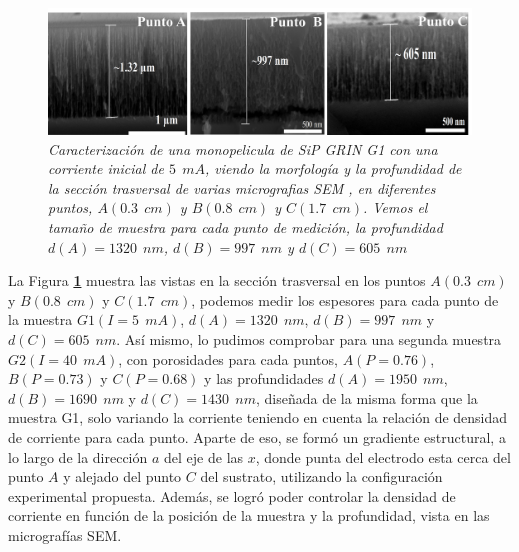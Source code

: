 \documentclass[a4paper,11pt,]{book}
\begin{document}
\begin{figure}[H]
	\centering
	\includegraphics[scale=.3]{../Images/semD11}
	\caption{\emph{Caracterización de una monopelicula de SiP GRIN G1 con una corriente inicial  de  $5 \ \ mA$, viendo  la morfología y la profundidad de la sección trasversal de varias micrografias SEM , en diferentes puntos, $A(0.3\ \ cm)$ y $ B(0.8 \ \  cm)$ y $ C(1.7 \ \  cm)$. Vemos el tamaño de muestra para cada punto de medición, la profundidad  $d(A)=1320 \ \ nm$, $d(B)=997\ \  nm$ y $d(C)=605\ \  nm$ } }
	\label{fig:DR4}
\end{figure} 
La Figura \textbf{\ref{fig:DR4}} muestra las vistas en la sección trasversal en los puntos $A(0.3\ \ cm)$ y $ B(0.8 \ \  cm)$ y $ C(1.7 \ \  cm)$, podemos medir  los espesores para cada punto de la muestra $G1(I=5 \ \ mA)$, $d(A)=1320 \ \ nm$, $d(B)=997\ \  nm$ y $d(C)=605\ \  nm$. Así mismo, lo pudimos comprobar para una segunda  muestra $G2 (I=40 \ \ mA)$, con porosidades para cada puntos, $A(P=0.76)$, $B(P=0.73)$ y $C(P= 0.68)$ y las profundidades  $d(A)=1950 \ \ nm$, $d(B)=1690\ \  nm$ y $d(C)=1430\ \  nm$, diseñada de la misma forma que la muestra G1, solo variando la corriente teniendo en cuenta la relación de densidad de corriente para cada punto. Aparte de eso, se formó un gradiente estructural, a lo largo de la dirección $a$ del eje de las $x$, donde  punta del electrodo esta cerca del punto $A$ y alejado del  punto $C$ del sustrato, utilizando la configuración experimental propuesta. Además, se logró poder controlar la densidad de corriente en función de la posición de la muestra y la profundidad, vista en las micrografías SEM. 
\end{document}

